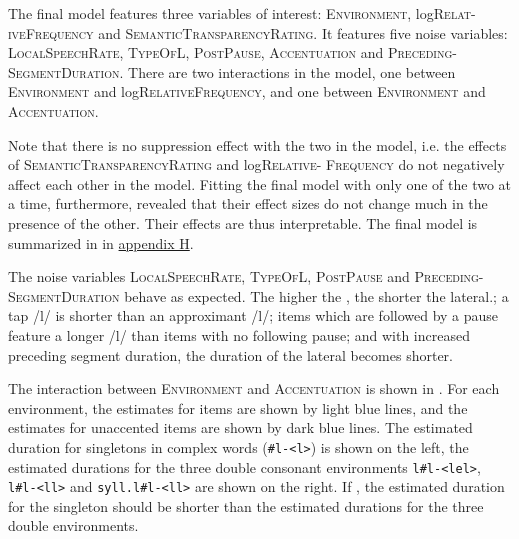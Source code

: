 The final model features three variables of interest: \textsc{Environment}, log\textsc{Relat-iveFrequency} and \textsc{SemanticTransparencyRating}. It features five noise variables: \textsc{LocalSpeechRate}, \textsc{TypeOfL}, \textsc{PostPause}, \textsc{Accentuation} and \textsc{Preceding-SegmentDuration}. 
There are two interactions in the model, one between \textsc{Environment} and log\textsc{RelativeFrequency}, and one between \textsc{Environment} and \textsc{Accentuation}. 

Note that there is no suppression effect with the two  in the model, i.e. the effects of  \textsc{SemanticTransparencyRating} and log\textsc{Relative- Frequency} do not negatively affect each other in the model. Fitting the final model with only one of the two  at a time, furthermore, revealed that their effect sizes do not change much in the presence of the other. Their effects are thus interpretable.
The final model is summarized in  in \hyperref[Appendix H: Model Summaries Experiment]{appendix H}.

The noise variables \textsc{LocalSpeechRate}, \textsc{TypeOfL}, \textsc{PostPause} and \textsc{Preceding- SegmentDuration} behave as expected. The higher the , the shorter the lateral.; a tap /l/ is shorter than an approximant /l/; items which are followed by a pause feature a longer /l/ than items with no following pause; and with increased preceding segment duration, the duration of the lateral becomes shorter.



The interaction between \textsc{Environment} and \textsc{Accentuation} is shown in . 
For each environment, the estimates for  items are shown by light blue lines, and the estimates for unaccented items are shown by dark blue lines. The estimated duration for singletons in complex words (\texttt{\#l-<l>}) is shown on the left, the estimated durations for the three double consonant environments \texttt{l\#l-<lel>}, \texttt{l\#l-<ll>} and \texttt{syll.l\#l-<ll>} are shown on the right. If  , the estimated duration for the singleton should be shorter than the estimated durations for the three double environments. 


